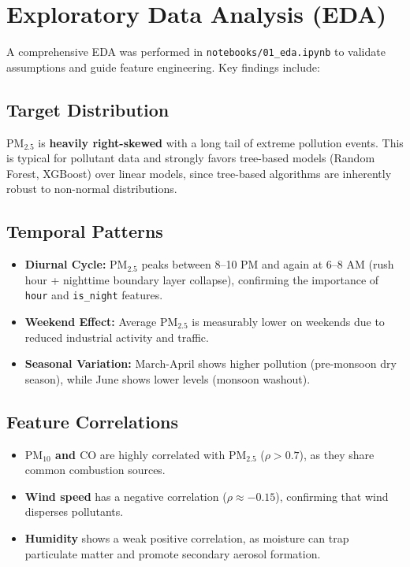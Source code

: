 \documentclass[11pt,a4paper]{article}
\begin{document}
\newpage
\section{Exploratory Data Analysis (EDA)}

A comprehensive EDA was performed in \texttt{notebooks/01\_eda.ipynb} to validate assumptions and guide feature engineering. Key findings include:

\subsection{Target Distribution}
$\text{PM}_{2.5}$ is \textbf{heavily right-skewed} with a long tail of extreme pollution events. This is typical for pollutant data and strongly favors tree-based models (Random Forest, XGBoost) over linear models, since tree-based algorithms are inherently robust to non-normal distributions.

\subsection{Temporal Patterns}
\begin{itemize}
    \item \textbf{Diurnal Cycle:} $\text{PM}_{2.5}$ peaks between 8--10 PM and again at 6--8 AM (rush hour + nighttime boundary layer collapse), confirming the importance of \texttt{hour} and \texttt{is\_night} features.
    \item \textbf{Weekend Effect:} Average $\text{PM}_{2.5}$ is measurably lower on weekends due to reduced industrial activity and traffic.
    \item \textbf{Seasonal Variation:} March-April shows higher pollution (pre-monsoon dry season), while June shows lower levels (monsoon washout).
\end{itemize}

\subsection{Feature Correlations}
\begin{itemize}
    \item \textbf{$\text{PM}_{10}$ and $\text{CO}$} are highly correlated with $\text{PM}_{2.5}$ ($\rho > 0.7$), as they share common combustion sources.
    \item \textbf{Wind speed} has a negative correlation ($\rho \approx -0.15$), confirming that wind disperses pollutants.
    \item \textbf{Humidity} shows a weak positive correlation, as moisture can trap particulate matter and promote secondary aerosol formation.
\end{itemize}
\end{document}
